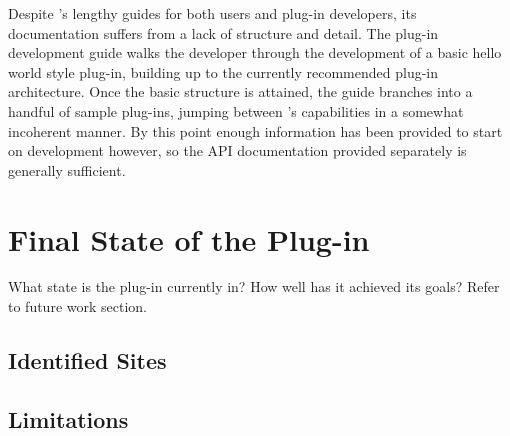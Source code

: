 Despite 's lengthy guides for both users and plug-in developers, its documentation suffers from a lack of structure and detail. The plug-in development guide walks the developer through the development of a basic hello world style plug-in, building up to the currently recommended plug-in architecture. Once the basic structure is attained, the guide branches into a handful of sample plug-ins, jumping between 's capabilities in a somewhat incoherent manner. By this point enough information has been provided to start on development however, so the API documentation provided separately is generally sufficient.



\section{Final State of the Plug-in}

What state is the plug-in currently in? How well has it achieved its goals? Refer to future work section.

\subsection{Identified Sites}

\subsection{Limitations}
